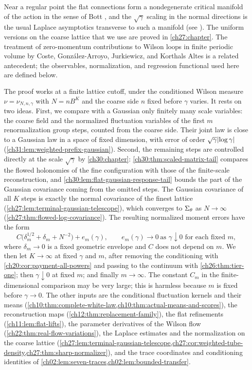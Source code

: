 Near a regular point the flat connections form a nondegenerate critical manifold of the action in the sense of Bott \cite{Bott1954CriticalManifolds}, and the $\sqrt\gamma$ scaling in the normal directions is the usual Laplace asymptotics transverse to such a manifold (see \cite{Wong2001AsymptoticIntegrals}). The uniform versions on the coarse lattice that we use are proved in \cref{ch27:chapter}. The treatment of zero-momentum contributions to Wilson loops in finite periodic volume by Coste, Gonz\'alez-Arroyo, Jurkiewicz, and Korthals Altes \cite{CosteEtAl1985ZeroMomentum} is a related antecedent; the observables, normalization, and regression functional used here are defined below.

The proof works at a finite lattice cutoff, under the conditioned Wilson measure $\nu=\nu_{N,n,\gamma}$ with $N=nB^K$ and the coarse side $n$ fixed before $\gamma$ varies. It rests on two ideas. First, we compare with a Gaussian only finitely many scale variables: the coarse field and the normalized fluctuation variables of the first $m$ renormalization group steps, counted from the coarse side. Their joint law is close to a Gaussian law in a space of fixed dimension, with error of order $\sqrt\gamma\lvert \log\gamma\rvert$ (\cref{ch31:lem:weighted-prefix-gaussian}). Second, the remaining steps are controlled directly at the scale $\sqrt\gamma$ by \cref{ch30:chapter}: \cref{ch30:thm:scaled-matrix-tail} compares the flowed holonomies of the fine configuration with those of the finite-scale reconstruction, and \cref{ch30:lem:flat-gaussian-response-tail} bounds the part of the Gaussian covariance coming from the omitted steps. The Gaussian covariance of all $K$ steps is exactly the normal covariance of the finest lattice (\cref{ch27:lem:terminal-gaussian-telescope}), which converges to $\Sigma_\theta$ as $N\to\infty$ (\cref{ch27:thm:flowed-log-covariance}). The resulting normalized moment errors have the form
\[
 C\bigl(\delta_m^{1/2}+\delta_m+N^{-2}\bigr)+e_m(\gamma),\qquad e_m(\gamma)\to0\ \text{as }\gamma\downarrow0\text{ for each fixed }m,
\]
where $\delta_m\to0$ is a fixed geometric envelope and $C$ does not depend on $m$. We then let $K\to\infty$ at fixed $\gamma$ and $m$, after removing the conditioning with \cref{ch20:cor:payment-all-powers} and passing to the continuum with \cref{ch26:thm:tier-one}; then $\gamma\downarrow0$ at fixed $m$; and finally $m\to\infty$. The constant $C_m$ in the finite-dimensional comparison may be very large; this is harmless because $m$ is fixed before $\gamma\to0$. The other inputs are the conditional fluctuation kernels and their means (\cref{ch10:thm:complete-white-law,ch10:thm:actual-means-and-scores}), the reconstruction maps (\cref{ch12:thm:replacement-family}), the flat refinements (\cref{ch11:lem:flat-lifts}), the parameter derivatives of the Wilson flow (\cref{ch22:thm:real-flow-variations}), the Laplace estimates and the normalization on the coarse lattice (\cref{ch27:lem:terminal-gaussian-telescope,ch27:cor:weighted-tube-density,ch27:thm:sharp-normalizer}), and the trace coordinates and conditioning identities of \cref{ch02:lem:seven-traces,ch02:lem:bounded-transfer}.

